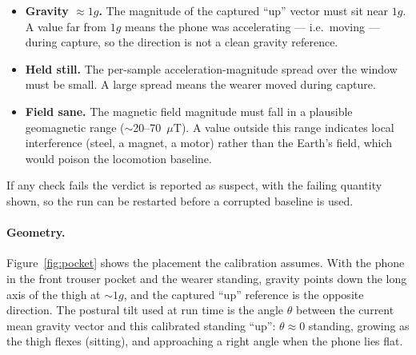 \documentclass[11pt]{article}
\begin{document}
\begin{itemize}
  \item \textbf{Gravity $\approx 1g$.} The magnitude of the captured ``up'' vector must
        sit near $1g$. A value far from $1g$ means the phone was accelerating --- i.e.\
        moving --- during capture, so the direction is not a clean gravity reference.
  \item \textbf{Held still.} The per-sample acceleration-magnitude spread over the
        window must be small. A large spread means the wearer moved during capture.
  \item \textbf{Field sane.} The magnetic field magnitude must fall in a plausible
        geomagnetic range ($\sim$20--70~$\mu$T). A value outside this range indicates
        local interference (steel, a magnet, a motor) rather than the Earth's field,
        which would poison the locomotion baseline.
\end{itemize}

If any check fails the verdict is reported as suspect, with the failing quantity shown,
so the run can be restarted before a corrupted baseline is used.

\paragraph{Geometry.}
Figure~\ref{fig:pocket} shows the placement the calibration assumes. With the phone in
the front trouser pocket and the wearer standing, gravity points down the long axis of
the thigh at $\sim 1g$, and the captured ``up'' reference is the opposite direction.
The postural tilt used at run time is the angle $\theta$ between the current mean
gravity vector and this calibrated standing ``up'': $\theta \approx 0$ standing,
growing as the thigh flexes (sitting), and approaching a right angle when the phone
lies flat.
\end{document}
